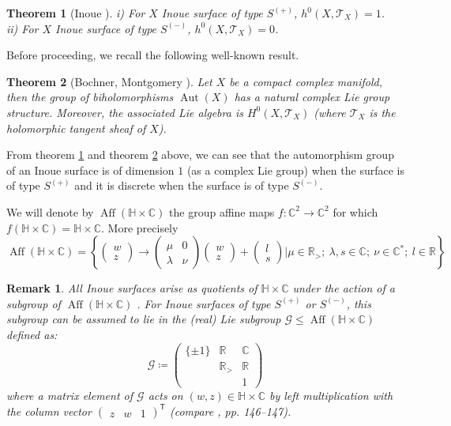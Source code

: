 \documentclass[12pt]{amsart}
\newtheorem{theorem}{Theorem}[section]
\newtheorem{remark}{Remark}[section]
\newcommand{\R}{\mathbb{R}}
\newcommand{\C}{\mathbb{C}}
\newcommand{\HH}{\mathbb{H}}
\DeclareMathOperator{\Aut}{Aut}
\DeclareMathOperator{\Aff}{Aff}
\begin{document}
\begin{theorem}[Inoue \cite{Ino}] \label{dim}
i) For $X$ Inoue surface of type $S^{(+)}$, $h^0(X, \mathcal{T}_X)=1$.\\
ii) For $X$ Inoue surface of type $S^{(-)}$, $h^0(X, \mathcal{T}_X)=0$.
\end{theorem}

\noindent
Before proceeding, we recall the following well-known result.
\begin{theorem} [Bochner, Montgomery \cite{BM}] \label{bm}
Let $X$ be a compact complex manifold, then the group of biholomorphisms $\Aut(X)$ has a natural complex Lie group structure. Moreover, the associated Lie algebra is $H^0(X, \mathcal{T}_X)$ (where $\mathcal{T}_X$ is the holomorphic tangent sheaf of $X$).
\end{theorem}

\noindent
From theorem \ref{dim} and theorem \ref{bm} above, we can see that the automorphism group of an Inoue surface is of dimension $1$ (as a complex Lie group) when the surface is of type $S^{(+)}$ and it is discrete when the surface is of type $S^{(-)}$.\par

\noindent
We will denote by $\Aff(\HH \times \C)$ the group affine maps $f: \C^2 \to \C^2$ for which $f(\HH \times \C) = \HH \times \C$. More precisely
$$\Aff(\HH \times \C)= \left\{ 
\begin{pmatrix}
w \\
z 
\end{pmatrix} \to
\begin{pmatrix}
\mu & 0 \\
\lambda & \nu
\end{pmatrix}
\begin{pmatrix}
w \\
z 
\end{pmatrix} +
\begin{pmatrix}
l \\
s 
\end{pmatrix} \vert
\mu \in \R_>;\  \lambda, s \in \C;\  \nu \in \C^*;\  l \in \R 
 \right\}$$

\begin{remark} \label{Emb}
All Inoue surfaces arise as quotients of $\mathbb{H} \times \mathbb{C}$ under the action of a subgroup of $\Aff(\mathbb{H} \times \mathbb{C})$ \cite{Ino}. For Inoue surfaces of type $S^{(+)}$ or $S^{(-)}$, this subgroup can be assumed to lie in the (real) Lie subgroup $\mathcal{G} \leq \Aff(\mathbb{H} \times \mathbb{C})$ defined as:
\[
\mathcal{G} \coloneqq 
\begin{pmatrix}
\{\pm 1\} & \mathbb{R} & \mathbb{C} \\
          & \mathbb{R}_{>} & \mathbb{R} \\
          &                 & 1
\end{pmatrix}
\]
where a matrix element of $\mathcal{G}$ acts on $(w,z)\in \HH \times \C$ by left multiplication with the column vector  $\begin{pmatrix} z & w & 1 \end{pmatrix}^\mathsf{T}$ (compare \cite{Wall}, pp. 146--147).\par
\end{remark}
\end{document}
